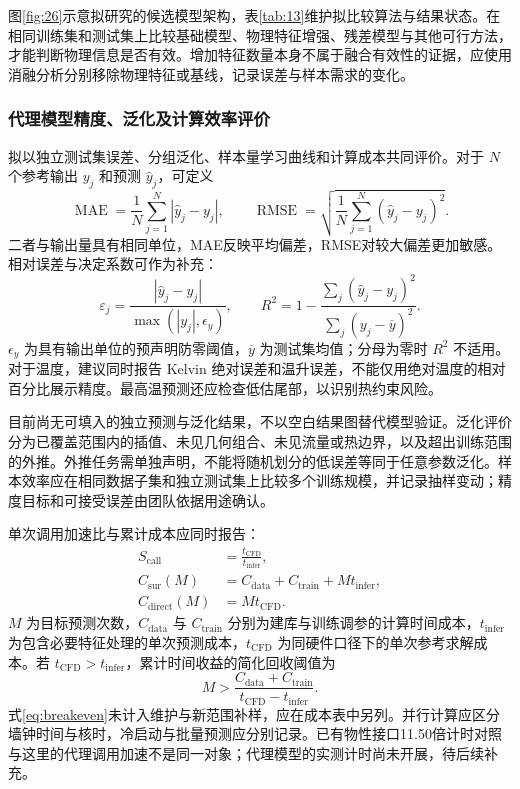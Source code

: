 \documentclass[UTF8]{midterm}
\begin{document}
图\ref{fig:26}示意拟研究的候选模型架构，表\ref{tab:13}维护拟比较算法与结果状态。在相同训练集和测试集上比较基础模型、物理特征增强、残差模型与其他可行方法，才能判断物理信息是否有效。增加特征数量本身不属于融合有效性的证据，应使用消融分析分别移除物理特征或基线，记录误差与样本需求的变化。

\subsubsection{代理模型精度、泛化及计算效率评价}
拟以独立测试集误差、分组泛化、样本量学习曲线和计算成本共同评价。对于 $N$ 个参考输出 $y_j$ 和预测 $\widehat y_j$，可定义
\begin{equation}
\operatorname{MAE}=\frac1N\sum_{j=1}^N|\widehat y_j-y_j|,\qquad
\operatorname{RMSE}=\sqrt{\frac1N\sum_{j=1}^N(\widehat y_j-y_j)^2}.\label{eq:errors}
\end{equation}
二者与输出量具有相同单位，MAE反映平均偏差，RMSE对较大偏差更加敏感。相对误差与决定系数可作为补充：
\begin{equation}
\varepsilon_{j}=\frac{|\widehat y_j-y_j|}{\max(|y_j|,\epsilon_y)},\qquad
R^2=1-\frac{\sum_j(\widehat y_j-y_j)^2}{\sum_j(y_j-\overline y)^2}.\label{eq:relative}
\end{equation}
$\epsilon_y$ 为具有输出单位的预声明防零阈值，$\overline y$ 为测试集均值；分母为零时 $R^2$ 不适用。对于温度，建议同时报告 Kelvin 绝对误差和温升误差，不能仅用绝对温度的相对百分比展示精度。最高温预测还应检查低估尾部，以识别热约束风险。

目前尚无可填入的独立预测与泛化结果，不以空白结果图替代模型验证。泛化评价分为已覆盖范围内的插值、未见几何组合、未见流量或热边界，以及超出训练范围的外推。外推任务需单独声明，不能将随机划分的低误差等同于任意参数泛化。样本效率应在相同数据子集和独立测试集上比较多个训练规模，并记录抽样变动；精度目标和可接受误差由团队依据用途确认。

单次调用加速比与累计成本应同时报告：
\begin{equation}\begin{aligned}
S_{\mathrm{call}}&=\frac{t_{\mathrm{CFD}}}{t_{\mathrm{infer}}},\\
C_{\mathrm{sur}}(M)&=C_{\mathrm{data}}+C_{\mathrm{train}}+M t_{\mathrm{infer}},\\
C_{\mathrm{direct}}(M)&=M t_{\mathrm{CFD}}.
\end{aligned}\label{eq:cost}
\end{equation}
$M$ 为目标预测次数，$C_{\mathrm{data}}$ 与 $C_{\mathrm{train}}$ 分别为建库与训练调参的计算时间成本，$t_{\mathrm{infer}}$ 为包含必要特征处理的单次预测成本，$t_{\mathrm{CFD}}$ 为同硬件口径下的单次参考求解成本。若 $t_{\mathrm{CFD}}>t_{\mathrm{infer}}$，累计时间收益的简化回收阈值为
\begin{equation}
M>\frac{C_{\mathrm{data}}+C_{\mathrm{train}}}{t_{\mathrm{CFD}}-t_{\mathrm{infer}}}.\label{eq:breakeven}
\end{equation}
式\eqref{eq:breakeven}未计入维护与新范围补样，应在成本表中另列。并行计算应区分墙钟时间与核时，冷启动与批量预测应分别记录。已有物性接口11.50倍计时对照与这里的代理调用加速不是同一对象；代理模型的实测计时尚未开展，待后续补充。
\end{document}
